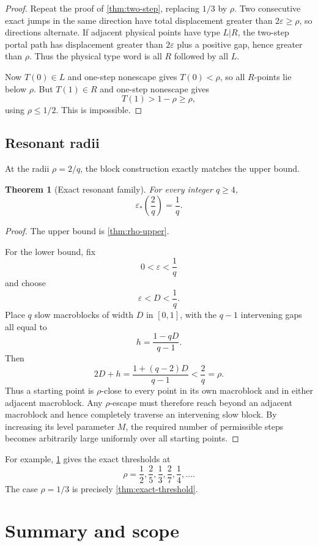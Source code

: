 \documentclass[11pt]{article}
\newtheorem{theorem}{Theorem}[section]
\newcommand{\eps}{\varepsilon}
\begin{document}
\begin{proof}
Repeat the proof of \cref{thm:two-step}, replacing $1/3$ by $\rho$. Two consecutive exact jumps in the same direction have total displacement greater than $2\eps\ge\rho$, so directions alternate. If adjacent physical points have type $L|R$, the two-step portal path has displacement greater than $2\eps$ plus a positive gap, hence greater than $\rho$. Thus the physical type word is all $R$ followed by all $L$.

Now $T(0)\in L$ and one-step nonescape gives $T(0)<\rho$, so all $R$-points lie below $\rho$. But $T(1)\in R$ and one-step nonescape gives
\[
T(1)>1-\rho\ge\rho,
\]
using $\rho\le1/2$. This is impossible.
\end{proof}

\subsection{Resonant radii}

At the radii $\rho=2/q$, the block construction exactly matches the upper bound.

\begin{theorem}[Exact resonant family]\label{thm:resonant}
For every integer $q\ge4$,
\[
\boxed{
\eps_*\!\left(\frac2q\right)=\frac1q.
}
\]
\end{theorem}

\begin{proof}
The upper bound is \cref{thm:rho-upper}.

For the lower bound, fix
\[
0<\eps<\frac1q
\]
and choose
\[
\eps<D<\frac1q.
\]
Place $q$ slow macroblocks of width $D$ in $[0,1]$, with the $q-1$ intervening gaps all equal to
\[
h=\frac{1-qD}{q-1}.
\]
Then
\[
2D+h
=
\frac{1+(q-2)D}{q-1}
<\frac2q=\rho.
\]
Thus a starting point is $\rho$-close to every point in its own macroblock and in either adjacent macroblock. Any $\rho$-escape must therefore reach beyond an adjacent macroblock and hence completely traverse an intervening slow block. By increasing its level parameter $M$, the required number of permissible steps becomes arbitrarily large uniformly over all starting points.
\end{proof}

For example, \cref{thm:resonant} gives the exact thresholds at
\[
\rho=\frac12,\frac25,\frac13,\frac27,\frac14,\ldots.
\]
The case $\rho=1/3$ is precisely \cref{thm:exact-threshold}.

\section{Summary and scope}
\end{document}

